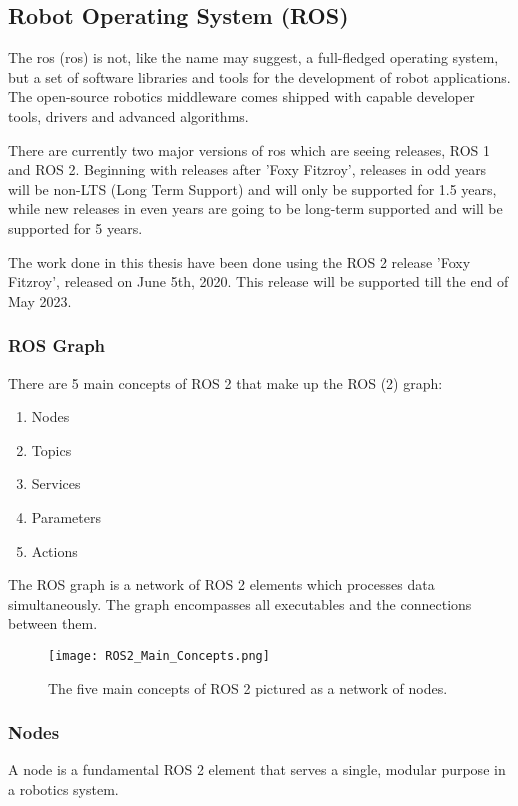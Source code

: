\subsection{Robot Operating System (ROS)}
The \acrlong{ros} (\acrshort{ros}) is not, like the name may suggest, a full-fledged operating system, but a set of software libraries and tools for the development of robot applications. The open-source robotics middleware comes shipped with capable developer tools, drivers and advanced algorithms. \cite{ros2_documentation}

There are currently two major versions of \acrshort{ros} which are seeing releases, ROS 1 and ROS 2. \cite{ros2_documentation} Beginning with releases after 'Foxy Fitzroy', releases in odd years will be non-LTS (Long Term Support) and will only be supported for 1.5 years, while new releases in even years are going to be long-term supported and will be supported for 5 years. \cite{ros2_documentation}

The work done in this thesis have been done using the ROS 2 release 'Foxy Fitzroy', released on June 5th, 2020. This release will be supported till the end of May 2023. \cite{ros2_releases_and_target_platforms}

\subsubsection{ROS Graph}
There are 5 main concepts of ROS 2 that make up the ROS (2) graph:
\begin{enumerate}
    \item Nodes
    \item Topics
    \item Services
    \item Parameters
    \item Actions
\end{enumerate}

The ROS graph is a network of ROS 2 elements which processes data simultaneously. The graph encompasses all executables and the connections between them.

\begin{figure}[H]
    \centering
    \texttt{[image: ROS2\_Main\_Concepts.png]}
    \caption{The five main concepts of ROS 2 pictured as a network of nodes.}
    \label{fig:ROS 2 main concepts}
\end{figure}

\subsubsection{Nodes}
A node is a fundamental ROS 2 element that serves a single, modular purpose in a robotics system. \cite{ros2_documentation}

